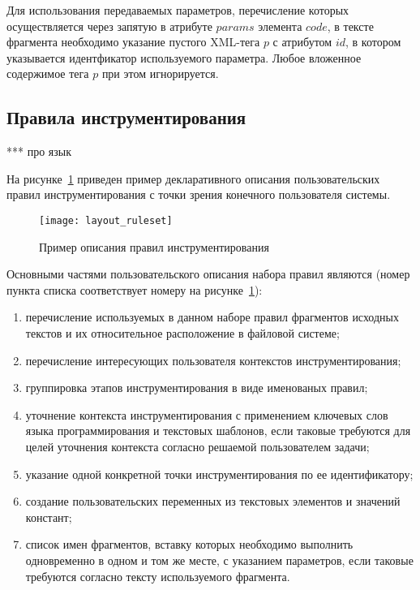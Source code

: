 Для использования передаваемых параметров, перечисление которых осуществляется через запятую в атрибуте $params$ элемента $code$, в тексте фрагмента необходимо указание пустого XML-тега $p$ с атрибутом $id$, в котором указывается идентфикатор используемого параметра.
Любое вложенное содержимое тега $p$ при этом игнорируется.

\subsection{Правила инструментирования}

***
про язык

На рисунке~\ref{fig:layout-ruleset} приведен пример декларативного описания пользовательских правил инструментирования с точки зрения конечного пользователя системы.

\begin{figure}[!h]
	\centering
	\texttt{[image: layout\_ruleset]}
	\caption{Пример описания правил инструментирования}
	\label{fig:layout-ruleset}
\end{figure}

Основными частями пользовательского описания набора правил являются (номер пункта списка соответствует номеру на рисунке~\ref{fig:layout-ruleset}):
\begin{enumerate}[noitemsep]
  \item перечисление используемых в данном наборе правил фрагментов исходных текстов и их относительное расположение в файловой системе;
  \item перечисление интересующих пользователя контекстов инструментирования;
  \item группировка этапов инструментирования в виде именованых правил;
  \item уточнение контекста инструментирования с применением ключевых слов языка программирования и текстовых шаблонов, если таковые требуются для целей уточнения контекста согласно решаемой пользователем задачи;
  \item указание одной конкретной точки инструментирования по ее идентификатору;
  \item создание пользовательских переменных из текстовых элементов и значений констант;
  \item список имен фрагментов, вставку которых необходимо выполнить одновременно в одном и том же месте, с указанием параметров, если таковые требуются согласно тексту используемого фрагмента.
\end{enumerate}

